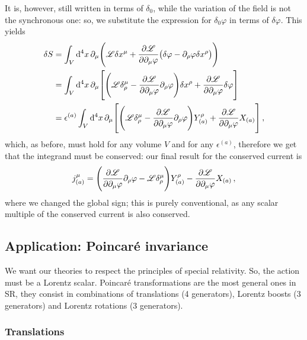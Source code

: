 \documentclass[main.tex]{subfiles}
\begin{document}
It is, however, still written in terms of \(\delta_0 \), while the variation of the field is not the synchronous one: so, we substitute the expression for \(\delta_0 \varphi \) in terms of \(\delta \varphi \). This yields 
%
\begin{align}
\delta S &=
\int_{V} \dd[4]{x} \partial_{\mu } \qty(\mathscr{L} \delta x^{\mu } + \pdv{\mathscr{L}}{\partial_{\mu } \varphi } \qty(\delta \varphi - \partial_{\rho  } \varphi \delta x^{\rho })  )  \\
&= \int_{V} \dd[4]{x} \partial_{\mu } \qty[ \qty(\mathscr{L} \delta^{\mu }_{\rho } - \pdv{\mathscr{L}}{\partial_{\mu } \varphi } \partial_{\rho } \varphi ) \delta x^{\rho }+ \pdv{\mathscr{L}}{\partial_{\mu }\varphi } \delta \varphi ]  \\
&= \epsilon^{(a)}\int_{V} \dd[4]{x} \partial_{\mu } \qty[ \qty(\mathscr{L} \delta^{\mu }_{\rho } - \pdv{\mathscr{L}}{\partial_{\mu } \varphi } \partial_{\rho } \varphi ) Y^{\rho }_{(a)}+ \pdv{\mathscr{L}}{\partial_{\mu }\varphi } X_{(a)} ]
\,,
\end{align}
%
which, as before, must hold for any volume \(V\) and for any \(\epsilon^{(a)}\), therefore we get that the integrand must be conserved: our final result for the conserved current is 
%
\begin{align}
j^{\mu }_{(a)} = \qty(\pdv{\mathscr{L}}{\partial_{\mu } \varphi } \partial_{\rho } \varphi  - \mathscr{L} \delta^{\mu }_{\rho } ) Y^{\rho }_{(a)}-  \pdv{\mathscr{L}}{\partial_{\mu }\varphi } X_{(a)}
\,,
\end{align}
%
where we changed the global sign; this is purely conventional, as any scalar multiple of the conserved current is also conserved.

\subsection{Application: Poincaré invariance} \label{sec:poincare-invariance-noether}

We want our theories to respect the principles of special relativity. So, the action must be a Lorentz scalar. 
Poincaré transformations are the most general ones in SR, they consist in combinations of translations (4 generators), Lorentz boosts (3 generators) and Lorentz rotations (3 generators).

\subsubsection{Translations}
\end{document}
